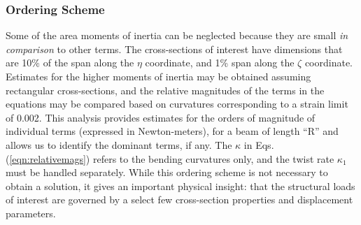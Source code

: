 \subsubsection{Ordering Scheme}
Some of the area moments of inertia can be neglected because they are small \emph{in comparison} to other terms. The cross-sections of interest have dimensions that are 10\% of the span along the $\eta$ coordinate, and 1\% span along the $\zeta$ coordinate. Estimates for the higher moments of inertia may be obtained assuming rectangular cross-sections, and the relative magnitudes of the terms in the equations may be compared based on curvatures corresponding to a strain limit of 0.002. This analysis provides estimates for the orders of magnitude of individual terms (expressed in Newton-meters), for a beam of length ``R'' and allows us to identify the dominant terms, if any. The $\kappa$ in Eqs. (\ref{eqn:relativemags}) refers to the bending curvatures only, and the twist rate $\kappa_1$ must be handled separately. While this ordering scheme is not necessary to obtain a solution, it gives an important physical insight: that the structural loads of interest are governed by a select few cross-section properties and displacement parameters.

